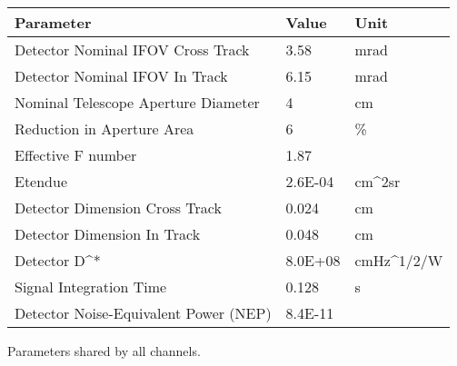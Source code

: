 \begin{tabular}{lll}
Parameter & Value & Unit\\
\hline
Detector Nominal IFOV Cross Track & 3.58 & mrad \\
Detector Nominal IFOV In Track & 6.15 & mrad \\
Nominal Telescope Aperture Diameter & 4 & cm\\
Reduction in Aperture Area & 6 & \% \\
Effective F number & 1.87 & \\
Etendue & 2.6E-04 & cm^{2}sr \\
Detector Dimension Cross Track & 0.024 & cm \\
Detector Dimension In Track & 0.048 & cm \\
Detector D^* & 8.0E+08 & cmHz^{1/2}/W \\
Signal Integration Time & 0.128 & s \\
Detector Noise-Equivalent Power (NEP) & 8.4E-11 & \\
\hline
\end{tabular}
\caption{\label{tab:parameters_shared} Parameters shared by all channels.}
